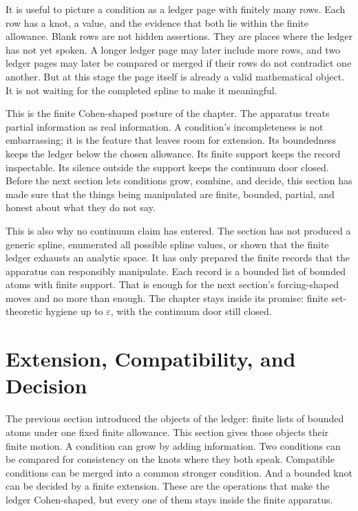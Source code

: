 It is useful to picture a condition as a ledger page with finitely many rows.
Each row has a knot, a value, and the evidence that both lie within the finite
allowance. Blank rows are not hidden assertions. They are places where the
ledger has not yet spoken. A longer ledger page may later include more rows,
and two ledger pages may later be compared or merged if their rows do not
contradict one another. But at this stage the page itself is already a valid
mathematical object. It is not waiting for the completed spline to make it
meaningful.

This is the finite Cohen-shaped posture of the chapter. The apparatus treats
partial information as real information. A condition's incompleteness is not
embarrassing; it is the feature that leaves room for extension. Its boundedness
keeps the ledger below the chosen allowance. Its finite support keeps the
record inspectable. Its silence outside the support keeps the continuum door
closed. Before the next section lets conditions grow, combine, and decide, this
section has made sure that the things being manipulated are finite, bounded,
partial, and honest about what they do not say.

This is also why no continuum claim has entered. The section has not produced a
generic spline, enumerated all possible spline values, or shown that the finite
ledger exhausts an analytic space. It has only prepared the finite records that
the apparatus can responsibly manipulate. Each record is a bounded list of
bounded atoms with finite support. That is enough for the next section's
forcing-shaped moves and no more than enough. The chapter stays inside its
promise: finite set-theoretic hygiene up to \(\varepsilon\), with the continuum
door still closed.

\section{Extension, Compatibility, and Decision}

The previous section introduced the objects of the ledger: finite lists of
bounded atoms under one fixed finite allowance. This section gives those
objects their finite motion. A condition can grow by adding information. Two
conditions can be compared for consistency on the knots where they both speak.
Compatible conditions can be merged into a common stronger condition. And a
bounded knot can be decided by a finite extension. These are the operations that
make the ledger Cohen-shaped, but every one of them stays inside the finite
apparatus.

